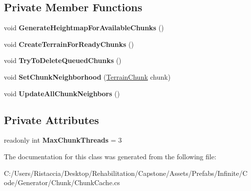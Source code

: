 \subsection*{Private Member Functions}
\begin{DoxyCompactItemize}
\item 
\mbox{\label{class_terrain_generator_1_1_chunk_cache_a92634880cb9e648def5d6f46252fb675}} 
void {\bfseries Generate\+Heightmap\+For\+Available\+Chunks} ()
\item 
\mbox{\label{class_terrain_generator_1_1_chunk_cache_ace36381e1561085f6e198b8e96f86203}} 
void {\bfseries Create\+Terrain\+For\+Ready\+Chunks} ()
\item 
\mbox{\label{class_terrain_generator_1_1_chunk_cache_a5b11904573854f383ff528a3f93571c8}} 
void {\bfseries Try\+To\+Delete\+Queued\+Chunks} ()
\item 
\mbox{\label{class_terrain_generator_1_1_chunk_cache_a084093aac88906af0a0cb3a6aad78277}} 
void {\bfseries Set\+Chunk\+Neighborhood} (\hyperlink{class_terrain_generator_1_1_terrain_chunk}{Terrain\+Chunk} chunk)
\item 
\mbox{\label{class_terrain_generator_1_1_chunk_cache_a25994bd99a0d681b7bcd46053905a33a}} 
void {\bfseries Update\+All\+Chunk\+Neighbors} ()
\end{DoxyCompactItemize}
\subsection*{Private Attributes}
\begin{DoxyCompactItemize}
\item 
\mbox{\label{class_terrain_generator_1_1_chunk_cache_a61391defc5efe827376ffdc4ce90cd3d}} 
readonly int {\bfseries Max\+Chunk\+Threads} = 3
\end{DoxyCompactItemize}


The documentation for this class was generated from the following file\+:\begin{DoxyCompactItemize}
\item 
C\+:/\+Users/\+Ristaccia/\+Desktop/\+Rehabilitation/\+Capstone/\+Assets/\+Prefabs/\+Infinite/\+Code/\+Generator/\+Chunk/Chunk\+Cache.\+cs\end{DoxyCompactItemize}
